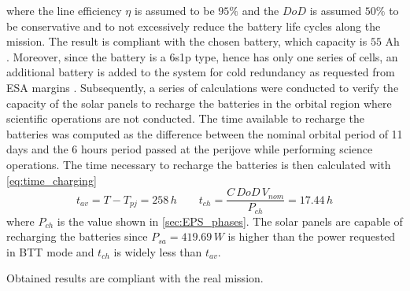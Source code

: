 where the line efficiency $\eta$ is assumed to be $95\%$ and the $DoD$ is assumed $50\%$ to be conservative and to not excessively reduce the battery life cycles along the mission. The result is compliant with the chosen battery, which capacity is $55$ Ah 
\mref.
Moreover, since the battery is a 6s1p type, hence has only one series of cells, an additional battery is added to the system for cold redundancy as requested from ESA margins 
\mref. 
Subsequently, a series of calculations were conducted to verify the capacity of the solar panels to recharge the batteries in the orbital region where scientific operations are not conducted. The time available to recharge the batteries was computed as the difference between the nominal orbital period of 11 days and the 6 hours period passed at the perijove while performing science operations. The time necessary to recharge the batteries is then calculated with \autoref{eq:time_charging}
\begin{equation}
    \label{eq:time_charging}
    t_{av} = T - T_{pj} = 258 \, h \qquad
    t_{ch}=\frac{C \, DoD \, V_{nom}}{P_{ch}}=17.44 \,h
\end{equation}
where $P_{ch}$ is the value shown in \autoref{sec:EPS_phases}. The solar panels are capable of recharging the batteries since $P_{sa}=419.69 \, W$ is higher than the power requested in BTT mode 
\mref 
and $t_{ch}$ is widely less than $t_{av}$. 

Obtained results are compliant with the real mission.  




